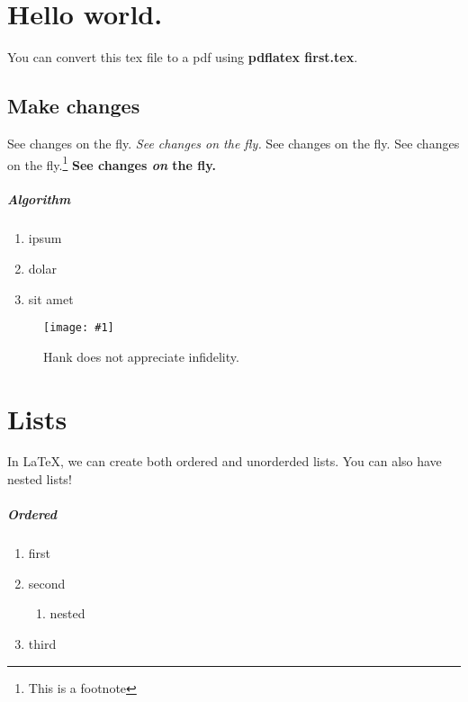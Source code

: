 \documentclass[]{report}
\newcommand \kw[1]{{\textbf{#1}}}
\newcommand \img[1]{\texttt{[image: \#1]}}
\begin{document}
\chapter{Hello world.}

You can convert this tex file to a pdf using \kw{pdflatex first.tex}.

\section{Make changes}

See changes on the fly. \emph{See changes on the fly.} See changes on the fly. See changes on the fly.\footnote[1]{This is a footnote}
\textbf{See changes \textit{on} the fly.}

\lipsum[1-5]

\paragraph{Algorithm}
\begin{enumerate}
    \item ipsum
    \item dolar
    \item sit amet 
\end{enumerate}

\begin{figure}
    \centering
    \img{hankwhore.jpeg}
    \caption[]{Hank does not appreciate infidelity.}
\end{figure}

\lipsum[6]

\chapter{Lists}

In \LaTeX, we can create both ordered and unorderded lists. You can also have nested lists!


\paragraph{Ordered}
\begin{enumerate}
    \item first
    \item second
    \begin{enumerate}
        \item nested
    \end{enumerate}
    \item third
\end{enumerate}
\end{document}
